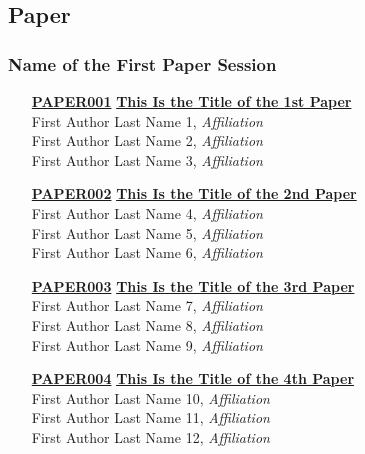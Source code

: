 
\subsection{Paper}
\subsubsection{Name of the First Paper Session}
\begin{enumerate}
\item[\href{https://doi.org/10.1145/1111111.1111112}{\textbf{PAPER001}}]
\href{https://doi.org/10.1145/1111111.1111112}{\textbf{This Is the Title of the 1st Paper}}\\
First Author Last Name 1, \emph{Affiliation}\\
First Author Last Name 2, \emph{Affiliation}\\
First Author Last Name 3, \emph{Affiliation}\\

\item[\href{https://doi.org/10.1145/1111111.1111113}{\textbf{PAPER002}}]
\href{https://doi.org/10.1145/1111111.1111113}{\textbf{This Is the Title of the 2nd Paper}}\\
First Author Last Name 4, \emph{Affiliation}\\
First Author Last Name 5, \emph{Affiliation}\\
First Author Last Name 6, \emph{Affiliation}\\

\item[\href{https://doi.org/10.1145/1111111.1111114}{\textbf{PAPER003}}]
\href{https://doi.org/10.1145/1111111.1111114}{\textbf{This Is the Title of the 3rd Paper}}\\
First Author Last Name 7, \emph{Affiliation}\\
First Author Last Name 8, \emph{Affiliation}\\
First Author Last Name 9, \emph{Affiliation}\\

\item[\href{https://doi.org/10.1145/1111111.1111115}{\textbf{PAPER004}}]
\href{https://doi.org/10.1145/1111111.1111115}{\textbf{This Is the Title of the 4th Paper}}\\
First Author Last Name 10, \emph{Affiliation}\\
First Author Last Name 11, \emph{Affiliation}\\
First Author Last Name 12, \emph{Affiliation}\\
\end{enumerate}

